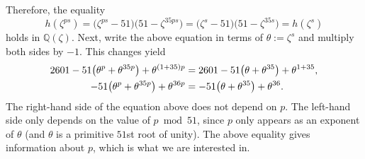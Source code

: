 \documentclass[a4paper, 12pt]{article}
\theoremstyle{definition}
\newcommand{\Q}{\ensuremath{\mathbb{Q}}}
\begin{document}
Therefore, the equality
\begin{equation*}
h(\zeta^{ps})=\big(\zeta^{ps}-51\big)\big({51}-\zeta^{35ps}\big)=\big(\zeta^{s}-51\big)\big({51}-\zeta^{35s}\big)=h(\zeta^{s})
\end{equation*}
holds in $\Q(\zeta)$. Next, write the above equation in terms of $\theta:=\zeta^{s}$ and multiply both sides by $-1$. This changes yield
\begin{align}
2601-{51}\big(\theta^{p}+\theta^{35p}\big)+\theta^{(1+35)p}&=2601-{51}\big(\theta+\theta^{35}\big)+\theta^{1+35}, \notag \\
-51\big(\theta^{p}+\theta^{35p}\big)+\theta^{36p}&=-51\big(\theta+\theta^{35}\big)+\theta^{36}\label{eq:equality_in_theta}.
\end{align}
The right-hand side of the equation above does not depend on $p$. The left-hand side only depends on the value of $p\bmod{51}$, since $p$ only appears as an exponent of $\theta$ (and $\theta$ is a primitive $51$st root of unity). The above equality gives information about $p$, which is what we are interested in. 
\end{document}
